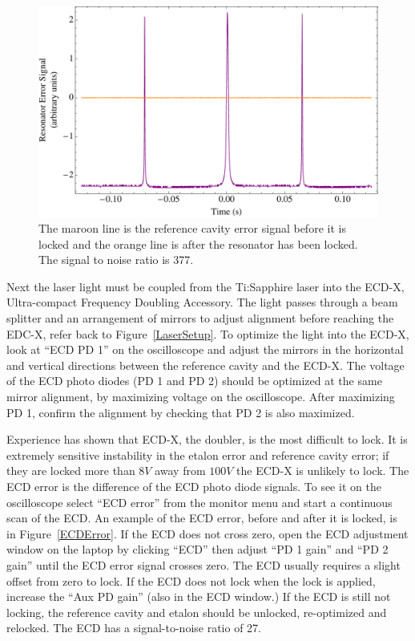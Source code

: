 \documentclass[prb,preprint]{revtex4-1}
\begin{document}
\begin{figure}[h!]
\centering
\includegraphics[width=6in]{ResonatorError.pdf}
\caption{The maroon line is the reference cavity error signal before it is locked and the orange line is after the resonator has been locked. The signal to noise ratio is 377.}
\label{ResonatorError}
\end{figure}

Next the laser light must be coupled from the Ti:Sapphire laser into the ECD-X, Ultra-compact Frequency Doubling Accessory. The light passes through a beam splitter and an arrangement of mirrors to adjust alignment before reaching the EDC-X, refer back to Figure~\ref{LaserSetup}. To optimize the light into the ECD-X, look at ``ECD PD 1'' on the oscilloscope and adjust the mirrors in the horizontal and vertical directions between the reference cavity and the ECD-X. The voltage of the ECD photo diodes (PD 1 and PD 2) should be optimized at the same mirror alignment, by maximizing voltage on the oscilloscope. After maximizing PD 1, confirm the alignment by checking that PD 2 is also maximized.

Experience has shown that ECD-X, the doubler, is the most difficult to lock. It is extremely sensitive instability in the etalon error and reference cavity error; if they are locked more than $8 V$ away from $100 V$ the ECD-X is unlikely to lock. The ECD error is the difference of the ECD photo diode signals. To see it on the oscilloscope select ``ECD error'' from the monitor menu and start a continuous scan of the ECD. An example of the ECD error, before and after it is locked, is in Figure~\ref{ECDError}. If the ECD does not cross zero, open the ECD adjustment window on the laptop by clicking ``ECD'' then adjust ``PD 1 gain'' and ``PD 2 gain'' until the ECD error signal crosses zero. The ECD usually requires a slight offset from zero to lock. If the ECD does not lock when the lock is applied, increase the ``Aux PD gain'' (also in the ECD window.) If the ECD is still not locking, the reference cavity and etalon should be unlocked, re-optimized and relocked. The ECD has a signal-to-noise ratio of 27.
\end{document}
